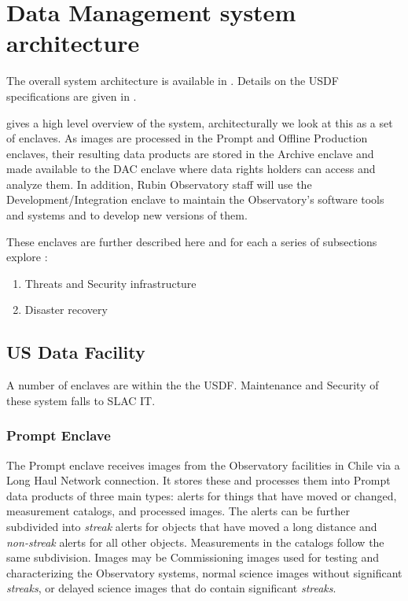 

\section{Data Management system architecture} \label{sec:dparc}
The overall system architecture is available in .
Details on the \gls{USDF} specifications are given in .

 gives a high level overview of the system, architecturally we look
at this as a set of enclaves.
As images are processed in the Prompt and Offline Production enclaves, their resulting data products are stored in the \gls{Archive} enclave and made available to the DAC enclave where data rights holders can access and analyze them.
In addition, Rubin Observatory staff will use the Development/Integration enclave to maintain the Observatory's software tools and systems and to develop new versions of them.

These enclaves are further described here and for each a series of subsections explore :


\begin{enumerate}
\item Threats and Security infrastructure
\item Disaster recovery
\end{enumerate}

\subsection{US Data Facility}\label{sec:usdf}

A number of enclaves are within the the USDF.
Maintenance and Security of these system falls to SLAC IT.

\subsubsection{Prompt \gls{Enclave}} \label{sec:promptenc}

The Prompt enclave receives images from the Observatory facilities in Chile via a Long Haul Network connection.
It stores these and processes them into Prompt data products of three main types:
alerts for things that have moved or changed, measurement catalogs, and processed images.
The alerts can be further subdivided into \emph{streak} alerts for objects that have moved a long distance and \emph{non-streak} alerts for all other objects.
Measurements in the catalogs follow the same subdivision. Images may be \gls{Commissioning} images used for testing and characterizing the Observatory systems, normal science images without significant \emph{streaks}, or delayed science images that do contain significant \emph{streaks}.

